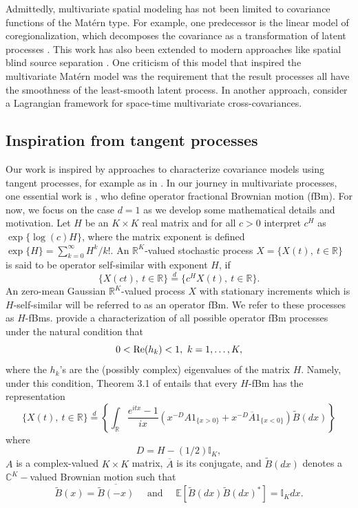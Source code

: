 \documentclass[11pt]{article}
\def\E{\mathbb E}
\def\C{\mathbb C}
\def\I{\mathbb I}
\def\R{\mathbb R}
\def\eqd{\stackrel{d}{=}}
\begin{document}
Admittedly, multivariate spatial modeling has not been limited to covariance functions of the Mat\'ern type. For example, one predecessor is the linear model of coregionalization, which decomposes the covariance as a transformation of latent processes \citep{cappello_computational_2021}. This work has also been extended to modern approaches like spatial blind source separation \citep{bachoc_spatial_2020}. One criticism of this model that inspired the multivariate Mat\'ern model was the requirement that the result processes all have the smoothness of the least-smooth latent process. In another approach, \cite{salvana_nonstationary_2020} consider a Lagrangian framework for space-time multivariate cross-covariances. 


\subsection{Inspiration from tangent processes}
Our work is inspired by approaches to characterize covariance models using tangent processes, for example as in \cite{shen_tangent_2021}. 
In our journey in multivariate processes, one essential work is \cite{didier_integral_2011}, who define operator fractional Brownian motion (fBm). For now, we focus on the case $d=1$ as we develop some mathematical details and motivation. Let $H$ be an $K\times K$ real matrix and for all $c>0$ interpret $c^H$ as $\exp\{ \log(c) H\}$, where the matrix exponent is defined $\exp\{H\} = \sum_{k=0}^\infty H^k/k!$. An $\mathbb{R}^K$-valued stochastic process $X = \{X(t),\ t\in\mathbb{R}\}$ is said to be operator self-similar with exponent $H$, if 
  $$
  \{X(ct),\ t\in \mathbb{R}\} \eqd \{ c^H X(t),\ t\in\mathbb{R}\}.
  $$
  An zero-mean Gaussian $\mathbb{R}^K$-valued process $X$ with stationary increments which is $H$-self-similar will be referred to as an operator fBm.  We refer to these processes as $H$-fBms. \cite{didier_integral_2011} provide a characterization of all possible operator fBm processes under the natural condition that
   $$
   0 < {\rm Re}(h_k) <1,\ k=1,\dots,K,
   $$
   where the $h_k$'s are the (possibly complex) eigenvalues of the matrix $H$.   Namely, under this condition, Theorem 3.1 of \cite{didier_integral_2011} entails that every $H$-fBm has the representation
   \begin{equation}\label{e:diddier-pipiras}
   \{X(t),\ t\in \R\} \eqd \left\{ \int_{\R} \frac{e^{itx} -1}{ix} \left( x^{-D}A1_{\{x > 0\}} + x^{-D}\overline{A}1_{\{x < 0\}}\right) \tilde B(dx)\right\}
   \end{equation}
   where
   $$
   D = H - (1/2)\I_K,
   $$
   $A$  is a complex-valued $K\times K$ matrix, $\overline A$ is its conjugate, and $\tilde B(dx)$ denotes a $\C^K-$valued Brownian motion such that
   $$
   \tilde B(x) = \overline {\tilde B(-x)}\quad \mbox{ and }\quad \E [\tilde B(dx) \tilde B(dx)^*] = \I_K dx.
   $$
   
\end{document}
